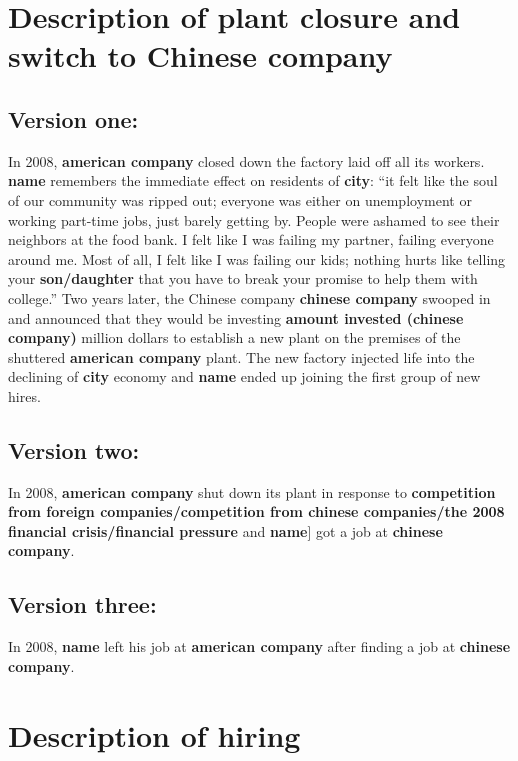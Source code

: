 \documentclass[12pt]{article}
\begin{document}
\section{Description of plant closure and switch to Chinese company}

\subsection{Version one:}

In 2008, \textbf{american company} closed down the factory laid off all its workers. \textbf{name} remembers the immediate effect on residents of \textbf{city}: ``it felt like the soul of our community was ripped out; everyone was either on unemployment or working part-time jobs, just barely getting by. People were ashamed to see their neighbors at the food bank. I felt like I was failing my partner, failing everyone around me. Most of all, I felt like I was failing our kids; nothing hurts like telling your \textbf{son/daughter} that you have to break your promise to help them with college.'' Two years later, the Chinese company \textbf{chinese company} swooped in and announced that they would be investing \textbf{amount invested (chinese company)} million dollars to establish a new plant on the premises of the shuttered \textbf{american company} plant. The new factory injected life into the declining of \textbf{city} economy and \textbf{name} ended up joining the first group of new hires.

\subsection{Version two:}

In 2008, \textbf{american company} shut down its plant in response to \textbf{competition from foreign companies/competition from chinese companies/the 2008 financial crisis/financial pressure} and \textbf{name}] got a job at \textbf{chinese company}.

\subsection{Version three:}

In 2008, \textbf{name} left his job at  \textbf{american company} after finding a job at \textbf{chinese company}.


\section{Description of hiring}
\end{document}
